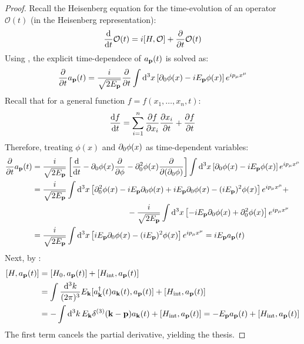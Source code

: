 \begin{proofbox}
  \begin{proof}
    Recall the Heisenberg equation for the time-evolution of an operator $ \mathcal{O}(t) $ (in the Heisenberg representation):
    \begin{equation}
      \frac{\mathrm{d}}{\mathrm{d} t} \mathcal{O}(t) = i [H , \mathcal{O}] + \frac{\partial}{\partial t} \mathcal{O}(t)
    \end{equation}
    Using , the explicit time-dependece of $ a_{\mathbf{p}}(t) $ is solved as:
    \begin{equation*}
      \frac{\partial}{\partial t} a_{\mathbf{p}}(t) = \frac{i}{\sqrt{2E_{\mathbf{p}}}} \frac{\partial}{\partial t} \int \mathrm{d}^3x \left[ \partial_0 \phi(x) - i E_{\mathbf{p}} \phi(x) \right] e^{i p_\mu x^\mu}
    \end{equation*}
    Recall that for a general function $ f = f(x_1, \dots, x_n, t) $:
    \begin{equation}
      \frac{\mathrm{d} f}{\mathrm{d} t} = \sum_{i = 1}^n \frac{\partial f}{\partial x_i} \frac{\partial x_i}{\partial t} + \frac{\partial f}{\partial t}
    \end{equation}
    Therefore, treating $ \phi(x) $ and $ \partial_0 \phi(x) $ as time-dependent variables:
    \begin{equation*}
      \begin{split}
        \frac{\partial}{\partial t} a_{\mathbf{p}}(t)
        & = \frac{i}{\sqrt{2E_{\mathbf{p}}}} \left[ \frac{\mathrm{d}}{\mathrm{d} t} - \partial_0 \phi(x) \frac{\partial}{\partial \phi} - \partial_0^2 \phi(x) \frac{\partial}{\partial (\partial_0 \phi)} \right] \int \mathrm{d}^3x \left[ \partial_0 \phi(x) - i E_{\mathbf{p}} \phi(x) \right] e^{i p_\mu x^\mu} \\
        & = \frac{i}{\sqrt{2E_{\mathbf{p}}}} \int \mathrm{d}^3x \left[ \partial_0^2 \phi(x) -i E_{\mathbf{p}} \partial_0 \phi(x) + i E_{\mathbf{p}} \partial_0 \phi(x) - (i E_{\mathbf{p}})^2 \phi(x) \right] e^{i p_\mu x^\mu} + \\
        & \qquad \qquad \qquad \qquad \qquad \qquad - \frac{i}{\sqrt{2E_{\mathbf{p}}}} \int \mathrm{d}^3x \left[ - i E_{\mathbf{p}} \partial_0 \phi(x) + \partial_0^2 \phi(x) \right] e^{i p_\mu x^\mu} \\
        & = \frac{i}{\sqrt{2E_{\mathbf{p}}}} \int \mathrm{d}^3x \left[ i E_{\mathbf{p}} \partial_0 \phi(x) - (i E_{\mathbf{p}})^2 \phi(x) \right] e^{i p_\mu x^\mu} = i E_{\mathbf{p}} a_{\mathbf{p}}(t)
      \end{split}
    \end{equation*}
    Next, by :
    \begin{equation*}
      \begin{split}
        [H , a_{\mathbf{p}}(t)]
        & = [H_0 , a_{\mathbf{p}}(t)] + [H_\text{int} , a_{\mathbf{p}}(t)] \\
        & = 
        \int \frac{\mathrm{d}^3k}{(2\pi)^3} E_{\mathbf{k}} [a_{\mathbf{k}}^\dagger(t) a_{\mathbf{k}}(t) , a_{\mathbf{p}}(t)] + [H_\text{int} , a_{\mathbf{p}}(t)] \\
        & = - \int \mathrm{d}^3k\, E_{\mathbf{k}} \delta^{(3)}(\mathbf{k} - \mathbf{p}) a_{\mathbf{k}}(t) + [H_\text{int} , a_{\mathbf{p}}(t)] = - E_{\mathbf{p}} a_{\mathbf{p}}(t) + [H_\text{int} , a_{\mathbf{p}}(t)]
      \end{split}
    \end{equation*}
    The first term cancels the partial derivative, yielding the thesis.
  \end{proof}
\end{proofbox}

